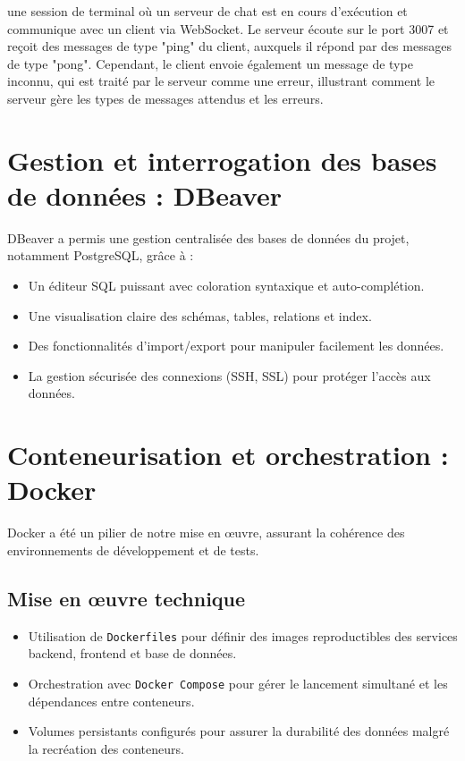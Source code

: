 \documentclass[12pt]{rapportPfe}
\begin{document}
une session de terminal où un serveur de chat est en cours d'exécution et communique avec un client via WebSocket. Le serveur écoute sur le port 3007 et reçoit des messages de type "ping" du client, auxquels il répond par des messages de type "pong". Cependant, le client envoie également un message de type inconnu, qui est traité par le serveur comme une erreur, illustrant comment le serveur gère les types de messages attendus et les erreurs.

\section{Gestion et interrogation des bases de données : DBeaver}

DBeaver a permis une gestion centralisée des bases de données du projet, notamment PostgreSQL, grâce à :

\begin{itemize}
    \item Un éditeur SQL puissant avec coloration syntaxique et auto-complétion.
    \item Une visualisation claire des schémas, tables, relations et index.
    \item Des fonctionnalités d’import/export pour manipuler facilement les données.
    \item La gestion sécurisée des connexions (SSH, SSL) pour protéger l’accès aux données.
\end{itemize}

\section{Conteneurisation et orchestration : Docker}

Docker a été un pilier de notre mise en œuvre, assurant la cohérence des environnements de développement et de tests.

\subsection{Mise en œuvre technique}

\begin{itemize}
    \item Utilisation de \texttt{Dockerfiles} pour définir des images reproductibles des services backend, frontend et base de données.
    \item Orchestration avec \texttt{Docker Compose} pour gérer le lancement simultané et les dépendances entre conteneurs.
    \item Volumes persistants configurés pour assurer la durabilité des données malgré la recréation des conteneurs.
\end{itemize}
\end{document}
